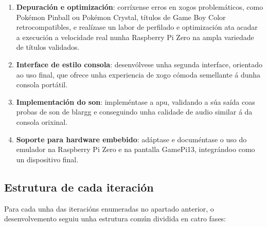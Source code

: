 \begin{enumerate}
     Válidanse coas probas de \acrshort{mbc} de mooneye.
    \item \textbf{Depuración e optimización}: corríxense erros en xogos problemáticos, 
    como Pokémon Pinball ou Pokémon Crystal, 
    títulos de Game Boy Color retrocompatibles, 
    e realízase un labor de perfilado e optimización ata acadar a execución 
    a velocidade real nunha Raspberry Pi Zero na ampla variedade de títulos validados.
    \item \textbf{Interface de estilo consola}: desenvólvese unha segunda interface,
    orientado ao uso final, que ofrece unha experiencia de xogo cómoda semellante
    á dunha consola portátil.
    \item \textbf{Implementación do son}: impleméntase a \acrfull{apu},
    validando a súa saída coas probas de son de blargg e conseguindo unha calidade de audio similar á da consola orixinal.
    \item \textbf{Soporte para hardware embebido}: adáptase e documéntase o uso do emulador
     na Raspberry Pi Zero e na pantalla GamePi13, integrándoo como un dispositivo final.
\end{enumerate}


\subsection{Estrutura de cada iteración}
Para cada unha das iteracións enumeradas no apartado anterior,
o desenvolvemento seguiu unha estrutura común dividida en catro fases:

